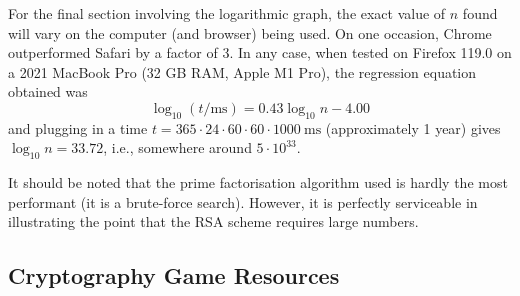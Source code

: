 \documentclass[12pt]{article}
\begin{document}
For the final section involving the logarithmic graph, the exact value of $n$ found will vary on the computer (and browser) being used.
On one occasion, Chrome outperformed Safari by a factor of 3.
In any case, when tested on Firefox 119.0 on a 2021 MacBook Pro (32 GB RAM, Apple M1 Pro), the regression equation obtained was
$$\log_{10} (t / \text{ms}) = 0.43\log_{10}{n} - 4.00$$
and plugging in a time $t = 365 \cdot 24 \cdot 60 \cdot 60 \cdot 1000~\text{ms}$ (approximately 1 year) gives $\log_{10}n = 33.72$, i.e., somewhere around $5 \cdot 10^{33}$.

It should be noted that the prime factorisation algorithm used is hardly the most performant (it is a brute-force search).
However, it is perfectly serviceable in illustrating the point that the RSA scheme requires large numbers.

\pagebreak

\subsection{Cryptography Game Resources}
\end{document}
